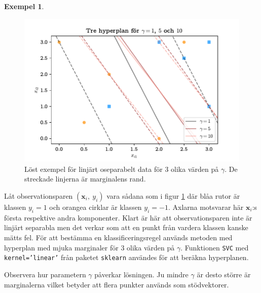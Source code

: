 \documentclass[a4paper, 12pt]{report}
\theoremstyle{definition}
\newtheorem{ex}{Exempel}[section]
\theoremstyle{remark}
\begin{document}
\begin{ex}
\begin{figure}[h]
	\centering
	\includegraphics[width=0.8\linewidth, trim={0.5cm 2mm 0.5cm 6mm}, clip]{KandFigur2.pdf}
	\caption{\label{fig:mjukamarginaler}Löst exempel för linjärt oseparabelt data för 3 olika värden på $\gamma$. De streckade linjerna är marginalens rand.}
\end{figure}
Låt observationsparen $\left(\mathbf{x}_i,~y_i\right)$ vara sådana som i figur \ref{fig:mjukamarginaler} där blåa rutor är klassen $y_i=1$ och orangea cirklar är klassen $y_i=-1$. Axlarna motsvarar här $\mathbf{x}_i$:s första respektive andra komponenter. Klart är här att observationsparen inte är linjärt separabla men det verkar som att en punkt från vardera klassen kanske mätts fel. För att bestämma en klassificeringsregel används metoden med hyperplan med mjuka marginaler för 3 olika värden på $\gamma$. Funktionen \texttt{SVC} med \texttt{kernel='linear'} från paketet \texttt{sklearn} \cite{sklearn} användes för att beräkna hyperplanen.

Observera hur parametern $\gamma$ påverkar lösningen. Ju mindre $\gamma$ är desto större är marginalerna vilket betyder att flera punkter används som stödvektorer.
\end{ex}
\end{document}
